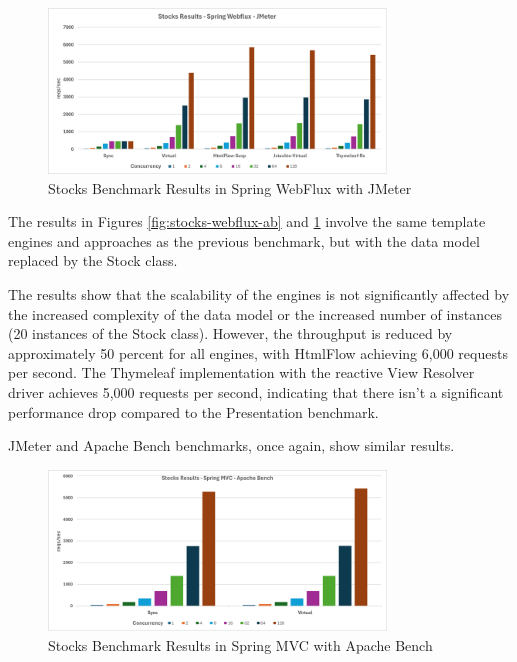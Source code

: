 \documentclass[../ppG48.tex]{subfiles}
\begin{document}
\begin{figure}[h] \centering \includegraphics[width=0.8\textwidth]{../Graphs/stocks-webflux-jmeter.png} \caption{Stocks Benchmark Results in Spring WebFlux with JMeter} \label{fig:stocks-webflux-jmeter} \end{figure}

The results in Figures \ref{fig:stocks-webflux-ab} and \ref{fig:stocks-webflux-jmeter} involve the same template engines and approaches as the previous benchmark, but with the data model replaced by the Stock class.

The results show that the scalability of the engines is not significantly affected by the increased complexity of the data model or the increased number of instances (20 instances of the Stock class). However, the throughput is reduced by approximately 50 percent for all engines, with HtmlFlow achieving 6,000 requests per second. The Thymeleaf implementation with the reactive View Resolver driver achieves 5,000 requests per second, indicating that there isn’t a significant performance drop compared to the Presentation benchmark.

JMeter and Apache Bench benchmarks, once again, show similar results.

\begin{figure}[h]
    \centering
    \includegraphics[width=0.8\textwidth]{../Graphs/stocks-springmvc-ab.png} 
    \caption{Stocks Benchmark Results in Spring MVC with Apache Bench}
    \label{fig:stocks-springmvc-ab} 
\end{figure}
\end{document}
